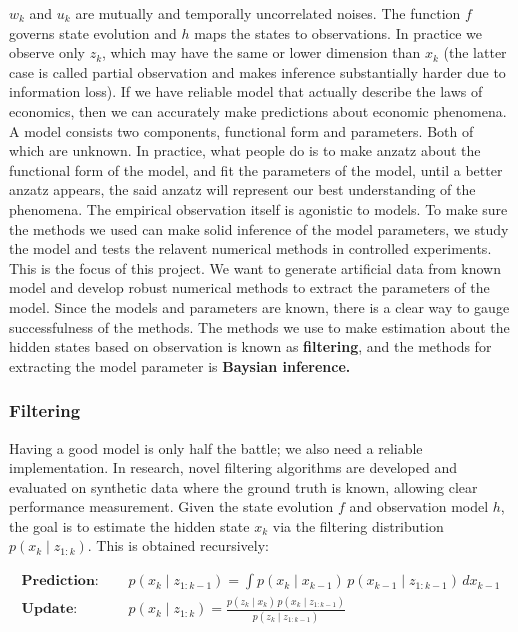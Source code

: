 \documentclass{article}
\begin{document}
$w_k$ and $u_k$ are mutually and temporally uncorrelated noises. The function $f$ governs state evolution and $h$ maps the states to observations. In practice we observe only $z_k$, which may have the same or lower dimension than $x_k$ (the latter case is called partial observation and makes inference substantially harder due to information loss). If we have reliable model that actually describe the laws of economics, then we can accurately make predictions about economic phenomena. A model consists two components, functional form and parameters. Both of which are unknown. In practice, what people do is to make anzatz about the functional form of the model, and fit the parameters of the model, until a better anzatz appears, the said anzatz will represent our best understanding of the phenomena. The empirical observation itself is agonistic to models. To make sure the methods we used can make solid inference of the model parameters, we study the model and tests the relavent numerical methods in controlled experiments. This is the focus of this project. We want to generate artificial data from known model and develop robust numerical methods to extract the parameters of the model. Since the models and parameters are known, there is a clear way to gauge successfulness of the methods. The methods we use to make estimation about the hidden states based on observation is known as \textbf{filtering}, and the methods for extracting the model parameter is \textbf{Baysian inference.}







\subsubsection{Filtering}

Having a good model is only half the battle; we also need a reliable implementation. In research, novel filtering algorithms are developed and evaluated on synthetic data where the ground truth is known, allowing clear performance measurement. Given the state evolution $f$ and observation model $h$, the goal is to estimate the hidden state $x_k$ via the filtering distribution $p(x_k \mid z_{1:k})$. This is obtained recursively:

\begin{equation}
\begin{split}
   \textbf{Prediction: } & \quad p(x_k \mid z_{1:k-1}) = \int p(x_k \mid x_{k-1}) \, p(x_{k-1} \mid z_{1:k-1}) \, dx_{k-1} \\[1ex]
   \textbf{Update: }     & \quad p(x_k \mid z_{1:k}) = \frac{p(z_k \mid x_k) \, p(x_k \mid z_{1:k-1})}{p(z_k \mid z_{1:k-1})}
\end{split}
\end{equation}
\end{document}
